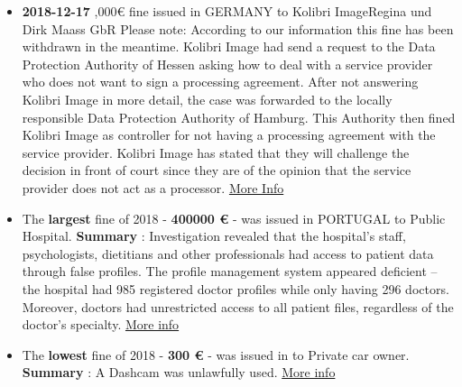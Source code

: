\documentclass[12pt]{article}
\begin{document}
\begin{multicols}{2}
\begin{itemize}
			\item \textbf{2018-12-17} ,000€ fine issued in GERMANY to Kolibri ImageRegina und Dirk Maass GbR
			\newline
			Please note: According to our information this fine has been withdrawn in the meantime. Kolibri Image had send a request to the Data Protection Authority of Hessen asking how to deal with a service provider who does not want to sign a processing agreement. After not answering Kolibri Image in more detail, the case was forwarded to the locally responsible Data Protection Authority of Hamburg. This Authority then fined Kolibri Image as controller for not having a processing agreement with the service provider. Kolibri Image has stated that they will challenge the decision in front of court since they are of the opinion that the service provider does not act as a processor.
			\newline
			\href{https://www.heise.de/newsticker/meldung/DSGVO-5000-Euro-Bussgeld-fuer-fehlenden-Auftragsverarbeitungsvertrag-4282737.html}{More Info}
		\end{itemize}
	\end{multicols}

\newpage
\justify
	\begin{multicols}{2}
	\raggedright{}
		\begin{itemize}
			\item The \textbf{largest} fine of 2018 - \textbf{400000 €} - was issued in PORTUGAL to Public Hospital.
			\newline
			\textbf{Summary} : Investigation revealed that the hospital’s staff, psychologists, dietitians and other professionals had access to patient data through false profiles.  The profile management system appeared deficient – the hospital had 985 registered doctor profiles while only having 296 doctors.  Moreover, doctors had unrestricted access to all patient files, regardless of the doctor’s specialty.
			\newline
			\href{https://www.cnpd.pt/bin/decisoes/Delib/20_984_2018.pdf}{More info}
			\vspace{1cm}
		
			\item The \textbf{lowest} fine of 2018 - \textbf{300 €} - was issued in  to Private car owner.
			\newline
			\textbf{Summary} : A Dashcam was unlawfully used.
			\newline
			\href{https://www.ris.bka.gv.at/Dokumente/Dsk/DSBT_20180927_DSB_D550_084_0002_DSB_2018_00/DSBT_20180927_DSB_D550_084_0002_DSB_2018_00.pdf}{More info}
		\end{itemize}
	\end{multicols}
\end{document}
